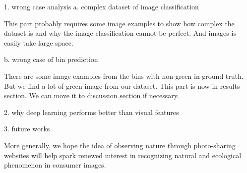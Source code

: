 
1. wrong case analysis
a. complex dataset of image classification

This part probably requires some image examples to show how complex the dataset is and why the 
image classification cannot be perfect. 
And images is easily take large space.

b. wrong case of bin prediction

There are some image examples from the bins with non-green in ground truth. But we find a lot of 
green image from our dataset.
This part is now in results section. We can move it to discussion section if necessary.

2. why deep learning performs better than visual features

3. future works



More generally, we hope
the idea of observing nature through photo-sharing websites will help
spark renewed interest in recognizing natural and ecological phenomenon in
consumer images.



